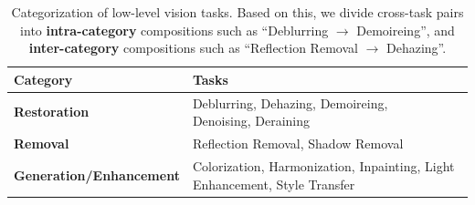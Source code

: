 \begin{table}[!ht]
\vspace{-6pt}
\centering
\footnotesize
\captionsetup{width=0.99\columnwidth, skip=4pt, type=table}
\caption{Categorization of low-level vision tasks. Based on this, we divide cross-task pairs into \textbf{intra-category} compositions such as ``Deblurring $\rightarrow$ Demoireing'', and \textbf{inter-category} compositions such as ``Reflection Removal $\rightarrow$ Dehazing''.}
\vspace{-1pt}
\renewcommand{\arraystretch}{1}
\begin{tabularx}{\columnwidth}{p{} X}
\hline
\textbf{Category} & \textbf{Tasks} \\ \hline
\rowcolor{lightred!30}
\textbf{Restoration} & \makecell[l]{Deblurring, Dehazing, Demoireing, \\Denoising, Deraining} \\
\rowcolor{lightyellow!30}
\textbf{Removal} & Reflection Removal, Shadow Removal \\
\rowcolor{lightblue!30}
\textbf{Generation\slash Enhancement} & Colorization, Harmonization, Inpainting, Light Enhancement, Style Transfer \\
\hline
\end{tabularx}
\label{tab:1}
\vspace{-6pt}
\end{table}
